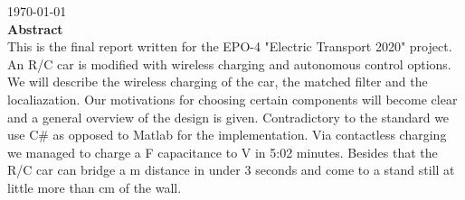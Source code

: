 \documentclass[12pt]{scrreprt}
\begin{document}
\begin{titlepage}


{\large \today}\\ [1.5cm]


 
% 

\textbf{Abstract} \\ 
This is the final report written for the EPO-4 "Electric Transport 2020" project. 
An R/C car is modified with wireless charging and autonomous control options. 
We will describe the wireless charging of the car, the matched filter and the localiazation.%
Our motivations for choosing certain components will become clear and a general overview of the design is given. 
Contradictory to the standard we use C\# as opposed to Matlab for the implementation. 
Via contactless charging we managed to charge a \unit[35]{F} capacitance to \unit[20]{V} in 5:02 minutes. 
Besides that the R/C car can bridge a \unit[3]{m} distance in under 3 seconds and come to a stand still at little more than \unit[10]{cm} of the wall.

\vfill %

\end{titlepage}
\end{document}

